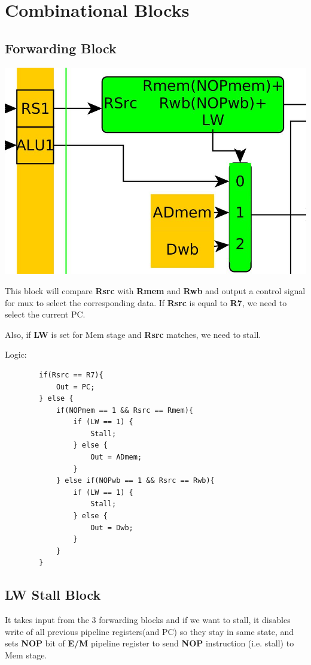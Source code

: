 \documentclass{article}
\begin{document}
\pagebreak
\section*{Combinational Blocks}
\subsection*{Forwarding Block}

\includegraphics[scale=0.4]{forwarding_block}

This block will compare \textbf{Rsrc} with \textbf{Rmem} and \textbf{Rwb} and
output a control signal for mux to select the corresponding data.
If \textbf{Rsrc} is equal to \textbf{R7}, we need to select the current PC.

Also, if \textbf{LW} is set for Mem stage and \textbf{Rsrc} matches, we need to
stall.

Logic:
    \begin{lstlisting}
        if(Rsrc == R7){
            Out = PC;
        } else {
            if(NOPmem == 1 && Rsrc == Rmem){
                if (LW == 1) {
                    Stall;
                } else {
                    Out = ADmem;
                }
            } else if(NOPwb == 1 && Rsrc == Rwb){
                if (LW == 1) {
                    Stall;
                } else {
                    Out = Dwb;
                }
            }
        }

    \end{lstlisting}

\subsection*{LW Stall Block}
It takes input from the 3 forwarding blocks and if we want to stall, it disables
write of all previous pipeline registers(and PC) so they stay in same state, and sets 
\textbf{NOP} bit of \textbf{E/M} pipeline register to send \textbf{NOP} instruction (i.e. stall) to Mem stage.
\end{document}
